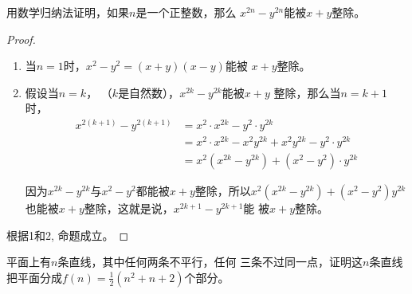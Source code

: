 \begin{example}
    用数学归纳法证明，如果$n$是一个正整数，那么
    $x^{2n}-y^{2n}$能被$x+y$整除。
\end{example}

\begin{proof}
\begin{enumerate}
    \item 当$n=1$时，$x^2-y^2=(x+y)(x-y)$能被
    $x+y$整除。
    \item 假设当$n=k$， （$k$是自然数），$x^{2k}-y^{2k}$能被$x+y$
    整除，那么当$n=k+1$时，
\[\begin{split}
    x^{2(k+1)}-y^{2(k+1)}
    &=x^2\cdot x^{2k}-y^2\cdot y^{2k}\\
    &=x^2\cdot x^{2k}-x^2y^{2k}+x^2y^{2k}-y^2\cdot y^{2k}\\
    &=x^2(x^{2k}-y^{2k})+(x^2-y^2)\cdot y^{2k}
\end{split}\]
    
    因为$x^{2k}-y^{2k}$与$x^2-y^2$都能被$x+y$整除，所以$x^2(x^{2k}-y^{2k})+(x^2-y^2)y^{2k}$也能被$x+y$整除，这就是说，$x^{2k+1}-y^{2k+1}$能
    被$x+y$整除。
\end{enumerate}  

根据1和2, 命题成立。
\end{proof}

\begin{example}
    平面上有$n$条直线，其中任何两条不平行，任何
三条不过同一点，证明这$n$条直线把平面分成$f(n)=\frac{1}{2}
(n^2+n+2)$个部分。
\end{example}

